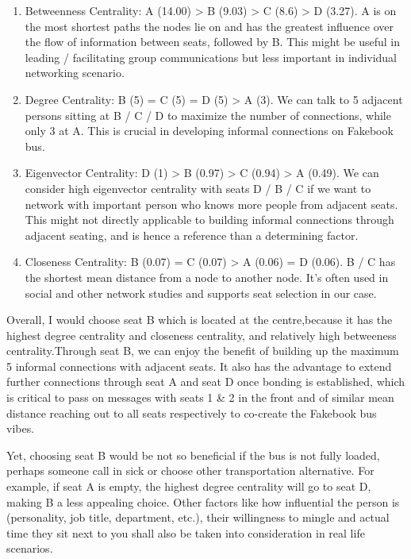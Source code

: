 \documentclass[
]{article}
\begin{document}
\begin{enumerate}
\def\labelenumi{\roman{enumi}.}
\item
  Betweenness Centrality: A (14.00) \textgreater{} B (9.03)
  \textgreater{} C (8.6) \textgreater{} D (3.27). A is on the most
  shortest paths the nodes lie on and has the greatest influence over
  the flow of information between seats, followed by B. This might be
  useful in leading / facilitating group communications but less
  important in individual networking scenario.
\item
  Degree Centrality: B (5) = C (5) = D (5) \textgreater{} A (3). We can
  talk to 5 adjacent persons sitting at B / C / D to maximize the number
  of connections, while only 3 at A. This is crucial in developing
  informal connections on Fakebook bus.
\item
  Eigenvector Centrality: D (1) \textgreater{} B (0.97) \textgreater{} C
  (0.94) \textgreater{} A (0.49). We can consider high eigenvector
  centrality with seats D / B / C if we want to network with important
  person who knows more people from adjacent seats. This might not
  directly applicable to building informal connections through adjacent
  seating, and is hence a reference than a determining factor.
\item
  Closeness Centrality: B (0.07) = C (0.07) \textgreater{} A (0.06) = D
  (0.06). B / C has the shortest mean distance from a node to another
  node. It's often used in social and other network studies and supports
  seat selection in our case.
\end{enumerate}

Overall, I would choose seat B which is located at the centre,because it
has the highest degree centrality and closeness centrality, and
relatively high betweeness centrality.Through seat B, we can enjoy the
benefit of building up the maximum 5 informal connections with adjacent
seats. It also has the advantage to extend further connections through
seat A and seat D once bonding is established, which is critical to pass
on messages with seats 1 \& 2 in the front and of similar mean distance
reaching out to all seats respectively to co-create the Fakebook bus
vibes.

Yet, choosing seat B would be not so beneficial if the bus is not fully
loaded, perhaps someone call in sick or choose other transportation
alternative. For example, if seat A is empty, the highest degree
centrality will go to seat D, making B a less appealing choice. Other
factors like how influential the person is (personality, job title,
department, etc.), their willingness to mingle and actual time they sit
next to you shall also be taken into consideration in real life
scenarios.
\end{document}
